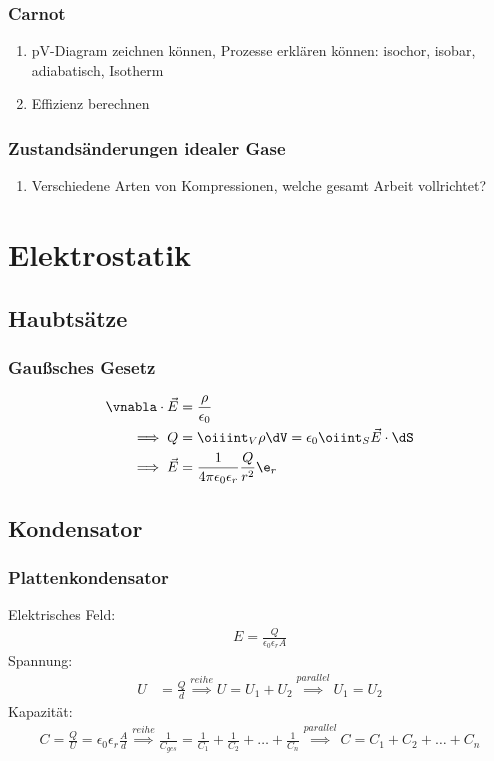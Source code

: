 \documentclass[11pt,letterpaper]{article}
\begin{document}
\subsubsection{Carnot}
\begin{enumerate}
    \item pV-Diagram zeichnen können, Prozesse erklären können:
    isochor, isobar, adiabatisch, Isotherm
    \item Effizienz berechnen
\end{enumerate}
\subsubsection{Zustandsänderungen idealer Gase}
\begin{enumerate}
    \item Verschiedene Arten von Kompressionen, welche gesamt Arbeit vollrichtet?
\end{enumerate}

\section{Elektrostatik}
\subsection{Haubtsätze}
\subsubsection{Gaußsches Gesetz}
\begin{align*}
    \vnabla \cdot \vec E &= \frac \rho {\epsilon_0}\\
    \implies Q &= \oiiint_{V} \rho \dV = \epsilon_0\oiint_{S} \vec E \cdot \dS\\
    \implies \vec E &= \frac{1}{4\pi \epsilon_0 \epsilon_r} \frac{Q}{r^2}\e_r\\
\end{align*}

\subsection{Kondensator}

\subsubsection{Plattenkondensator}
Elektrisches Feld:
\begin{align*}
    E = \frac{Q}{\epsilon_0\epsilon_r A}
\end{align*}
Spannung:
\begin{align*}
    U &= \frac Qd \overset{reihe}{\implies}U =U_1+U_2 \overset{parallel}{\implies} U_1=U_2
\end{align*}
Kapazität:
\begin{align*}
    C = \frac{Q}{U} = \epsilon_0\epsilon_r \frac{A}{d} 
    \overset{reihe}{\implies} \frac{1}{C_{ges}}= \frac{1}{C_1} + \frac{1}{C_2} + \dots + \frac{1}{C_n}
    \overset{parallel}{\implies} C=C_1 + C_2 + \dots + C_n
\end{align*}
\end{document}
